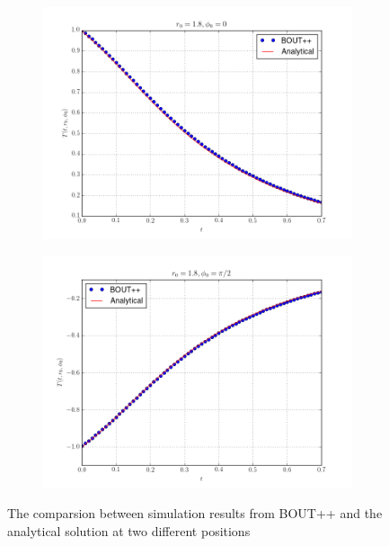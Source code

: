 \documentclass[11pt, oneside]{article}
\begin{document}
\begin{figure}
\centering
\begin{subfigure}{.5\textwidth}
  \centering
  \includegraphics[width=1.\linewidth]{pics/cmpr-1.png}
  \caption{}
  \label{fig:sub1}
\end{subfigure}%
\begin{subfigure}{.5\textwidth}
  \centering
  \includegraphics[width=1.\linewidth]{pics/cmpr-2.png}
  \caption{}
  \label{fig:sub2}
\end{subfigure}
\caption{The comparsion between simulation results from BOUT++ and the analytical solution at two different positions}
\label{fig:naive}
\end{figure}
\end{document}
